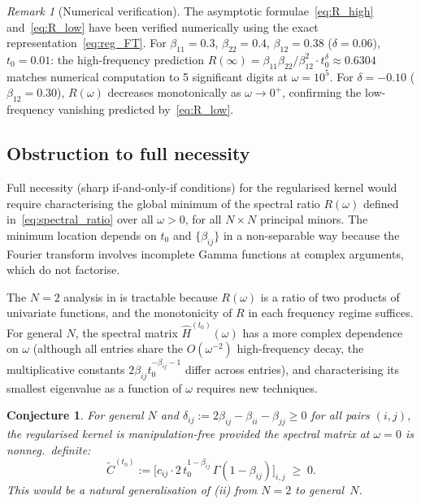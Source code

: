 \documentclass[12pt]{article}
\newtheorem{conjecture}[theorem]{Conjecture}
\theoremstyle{definition}
\theoremstyle{remark}
\newtheorem{remark}[theorem]{Remark}
\newcommand{\bC}{\widetilde{C}}
\begin{document}
\begin{remark}[Numerical verification]\label{rem:numerical_verify}
The asymptotic formulae~\eqref{eq:R_high} and~\eqref{eq:R_low} have been verified
numerically using the exact representation~\eqref{eq:reg_FT}.
For $\beta_{11}=0.3$, $\beta_{22}=0.4$, $\beta_{12}=0.38$
($\delta = 0.06$), $t_0=0.01$: the high-frequency prediction
$R(\infty)=\beta_{11}\beta_{22}/\beta_{12}^2\cdot t_0^{\delta}\approx 0.6304$
matches numerical computation to 5 significant digits at $\omega=10^5$.
For $\delta=-0.10$ ($\beta_{12}=0.30$), $R(\omega)$ decreases
monotonically as $\omega\to 0^+$, confirming the low-frequency vanishing
predicted by~\eqref{eq:R_low}.
\end{remark}

\subsection{Obstruction to full necessity}\label{sec:obstruction}

Full necessity (sharp if-and-only-if conditions) for the regularised kernel
would require characterising the global minimum of the spectral ratio
$R(\omega)$ defined in~\eqref{eq:spectral_ratio}
over all $\omega > 0$, for all $N\times N$ principal minors.  The minimum
location depends on $t_0$ and $\{\beta_{ij}\}$ in a non-separable way
because the Fourier transform involves incomplete Gamma functions at
complex arguments, which do not factorise.

The $N = 2$ analysis in  is tractable because
$R(\omega)$ is a ratio of two products of univariate functions, and
the monotonicity of $R$ in each frequency regime suffices.  For general
$N$, the spectral matrix $\widehat{H}^{(t_0)}(\omega)$ has a more
complex dependence on $\omega$ (although all entries share the $O(\omega^{-2})$
high-frequency decay, the multiplicative constants $2\beta_{ij}t_0^{-\beta_{ij}-1}$
differ across entries), and characterising its smallest eigenvalue as a function
of $\omega$ requires new techniques.

\begin{conjecture}\label{conj:reg_general}
For general $N$ and $\delta_{ij} := 2\beta_{ij}-\beta_{ii}-\beta_{jj} \ge 0$
for all pairs $(i,j)$, the regularised kernel is manipulation-free provided
the spectral matrix at $\omega=0$ is nonneg.\ definite:
\[
  \bC^{(t_0)} := \bigl[c_{ij}\cdot 2\,t_0^{1-\beta_{ij}}\,\Gamma(1-\beta_{ij})\bigr]_{i,j}
  \;\ge\; 0.
\]
This would be a natural generalisation of (ii)
from $N=2$ to general~$N$.
\end{conjecture}
\end{document}
